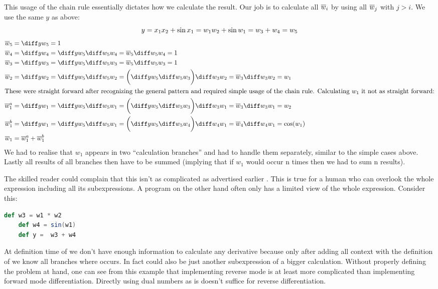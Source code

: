This usage of the chain rule essentially dictates how we calculate the result. Our job is to calculate all $\overline{w}_i$ by using all $\overline{w}_j$ with $j > i$.  We use the same $y$ as above:
\[ y = x_1x_2 + \sin{x_1} = w_1w_2 + \sin{w_1} = w_3 + w_4 = w_5 \]
\begin{align*}
    \overw{5} &= \diffyw{5} = 1 \\
    \overw{4} &= \diffyw{4} = \diffyw{5}\diffw{5}{4} = \overw{5}\diffw{5}{4} = 1\\
    \overw{3} &= \diffyw{3} = \diffyw{5}\diffw{5}{3} = \overw{5}\diffw{5}{3} = 1\\
    \overw{2} &= \diffyw{2} = \diffyw{5}\diffw{5}{2} = \bigg(\diffyw{5}\diffw{5}{3}\bigg)\diffw{3}{2} = \overw{3}\diffw{3}{2} = w_1 \\
    \intertext{These were straight forward after recognizing the general pattern and required simple usage of the chain rule. Calculating $w_1$ it not as straight forward:}
    \overw{1}^a &= \diffyw{1} = \diffyw{5}\diffw{5}{1} = \bigg(\diffyw{5}\diffw{5}{3}\bigg)\diffw{3}{1} = \overw{3}\diffw{3}{1} = w_2 \\
    \overw{1}^b &= \diffyw{1} = \diffyw{5}\diffw{5}{1} = \bigg(\diffyw{5}\diffw{5}{4}\bigg)\diffw{4}{1} = \overw{4}\diffw{4}{1} = \cos(w_1) \\
    \overw{1} &= \overw{1}^a + \overw{1}^b
\end{align*}
We had to realise that $w_1$ appears in two ``calculation branches'' and had to handle them separately, similar to the simple cases above. Lastly all results of all branches then have to be summed (implying that if $w_1$ would occur n times then we had to sum n results). 

The skilled reader could complain that this isn't as complicated as advertised \todowording earlier . This is true for a human who can overlook the whole expression including all its subexpressions. A program on the other hand often only has a limited view of the whole expression. Consider this:
\begin{lstlisting}[language=scala, label={lst:reverseProgramVsHuman}, caption={Limited context of a program opposed to a human}]
    def w3 = w1 * w2
    def w4 = sin(w1)
    def y =  w3 + w4
\end{lstlisting}
At definition time of  we don't have enough information to calculate any derivative because only after adding all context with the definition of  we know all branches where  occurs. In fact  could also be just another subexpression of a bigger calculation. Without properly defining the problem at hand, one can see from this example that implementing reverse mode is at least more complicated than implementing forward mode differentiation. \todowording Directly using dual numbers as is doesn't suffice for reverse differentiation.

